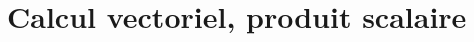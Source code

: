\documentclass[a4paper,11pt]{article}
\author{Pierquet}
\title{\nomfichier}
\begin{document}
\newcommand{\coord}[3]{\vect{#1}\begin{pmatrix}#2\\#3\end{pmatrix}}

\pagestyle{fancy}

\part{Calcul vectoriel, produit scalaire}

%
%
%
%
%
\end{document}
